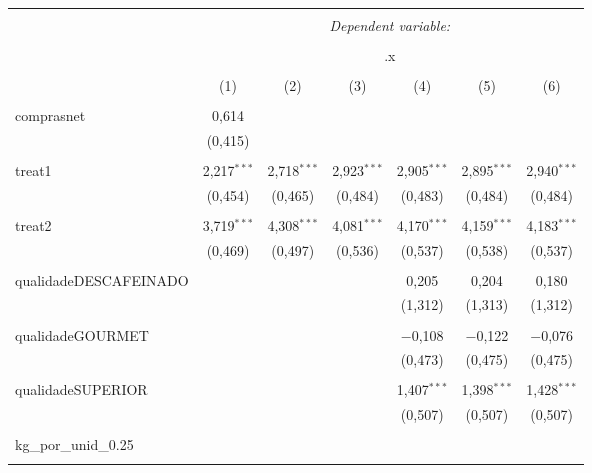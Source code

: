 
\begin{table}[!htbp] \centering 
  \caption{} 
  \label{} 
\begin{tabular}{@{\extracolsep{5pt}}lcccccc} 
\\[-1.8ex]\hline 
\hline \\[-1.8ex] 
 & \multicolumn{6}{c}{\textit{Dependent variable:}} \\ 
\cline{2-7} 
\\[-1.8ex] & \multicolumn{6}{c}{.x} \\ 
\\[-1.8ex] & (1) & (2) & (3) & (4) & (5) & (6)\\ 
\hline \\[-1.8ex] 
 comprasnet & 0,614 &  &  &  &  &  \\ 
  & (0,415) &  &  &  &  &  \\ 
  & & & & & & \\ 
 treat1 & 2,217$^{***}$ & 2,718$^{***}$ & 2,923$^{***}$ & 2,905$^{***}$ & 2,895$^{***}$ & 2,940$^{***}$ \\ 
  & (0,454) & (0,465) & (0,484) & (0,483) & (0,484) & (0,484) \\ 
  & & & & & & \\ 
 treat2 & 3,719$^{***}$ & 4,308$^{***}$ & 4,081$^{***}$ & 4,170$^{***}$ & 4,159$^{***}$ & 4,183$^{***}$ \\ 
  & (0,469) & (0,497) & (0,536) & (0,537) & (0,538) & (0,537) \\ 
  & & & & & & \\ 
 qualidadeDESCAFEINADO &  &  &  & 0,205 & 0,204 & 0,180 \\ 
  &  &  &  & (1,312) & (1,313) & (1,312) \\ 
  & & & & & & \\ 
 qualidadeGOURMET &  &  &  & $-$0,108 & $-$0,122 & $-$0,076 \\ 
  &  &  &  & (0,473) & (0,475) & (0,475) \\ 
  & & & & & & \\ 
 qualidadeSUPERIOR &  &  &  & 1,407$^{***}$ & 1,398$^{***}$ & 1,428$^{***}$ \\ 
  &  &  &  & (0,507) & (0,507) & (0,507) \\ 
  & & & & & & \\ 
 kg\_por\_unid\_0.25 &  &  &  &  &  &  \\ 
  &  &  &  &  &  &  \\ 

\end{tabular}
\end{table}
